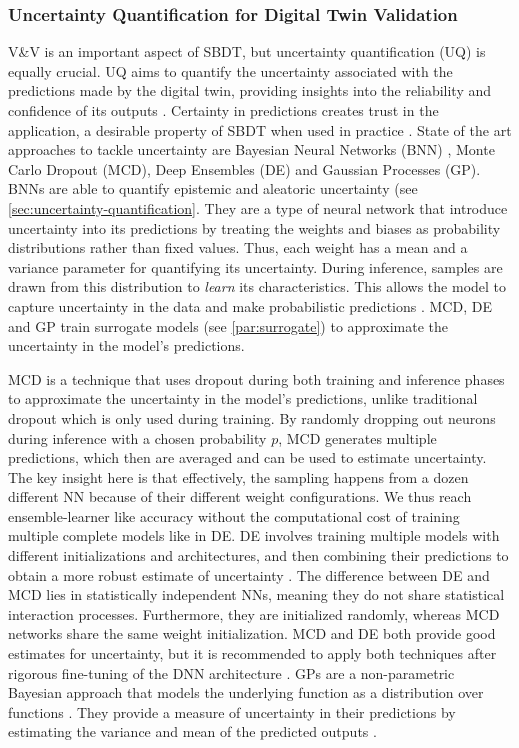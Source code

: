 \subsubsection*{Uncertainty Quantification for Digital Twin Validation}
\label{sec:uq-dt}
V&V is an important aspect of SBDT, but uncertainty quantification (UQ) is equally crucial. UQ aims to quantify the uncertainty associated with the predictions made by the digital twin, providing insights into the reliability and confidence of its outputs \autocite{sel2025survey}. Certainty in predictions creates trust in the application, a desirable property of SBDT when used in practice \autocite{dwivedi2023explainable}. State of the art approaches to tackle uncertainty are Bayesian Neural Networks (BNN) \autocite{li2017dynamic}, Monte Carlo Dropout (MCD), Deep Ensembles (DE) and Gaussian Processes (GP). BNNs are able to quantify epistemic and aleatoric uncertainty (see \autoref{sec:uncertainty-quantification}. They are a type of neural network that introduce uncertainty into its predictions by treating the weights and biases as probability distributions rather than fixed values. Thus, each weight has a mean and a variance parameter for quantifying its uncertainty. During inference, samples are drawn from this distribution to \textit{learn} its characteristics. This allows the model to capture uncertainty in the data and make probabilistic predictions \autocite{li2017dynamic}. MCD, DE and GP train surrogate models (see \autoref{par:surrogate}) to approximate the uncertainty in the model's predictions.

MCD is a technique that uses dropout \autocite{srivastava2014dropout} during both training and inference phases to approximate the uncertainty in the model's predictions, unlike traditional dropout which is only used during training. By randomly dropping out neurons during inference with a chosen probability $p$, MCD generates multiple predictions, which then are averaged and can be used to estimate uncertainty. The key insight here is that effectively, the sampling happens from a dozen different NN because of their different weight configurations. We thus reach ensemble-learner like accuracy without the computational cost of training multiple complete models like in DE.
DE involves training multiple models with different initializations and architectures, and then combining their predictions to obtain a more robust estimate of uncertainty \autocite{rahaman2021uncertainty}. The difference between DE and MCD lies in statistically independent NNs, meaning they do not share statistical interaction processes. Furthermore, they are initialized randomly, whereas MCD networks share the same weight initialization. MCD and DE both provide good estimates for uncertainty, but it is recommended to apply both techniques after rigorous fine-tuning of the DNN architecture \autocite{kamali2024advancements}.
GPs are a non-parametric Bayesian approach that models the underlying function as a distribution over functions \autocite{bilionis2012multi}. They provide a measure of uncertainty in their predictions by estimating the variance and mean of the predicted outputs \autocite{Burr2025TEADT}.


